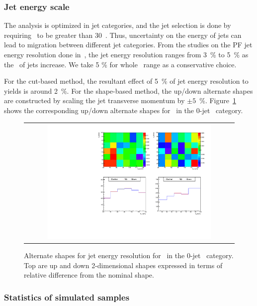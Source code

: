 \subsubsection{Jet energy scale} 

The analysis is optimized in jet categories, and the jet selection is done by 
requiring \pt\ to be greater than 30~\GeV. Thus, uncertainty on the 
energy of jets can lead to migration between different jet categories.  
From the studies on the PF jet energy resolution done in~\cite{Chatrchyan:2011ds}, 
the jet energy resolution ranges from 3~\% to 5~\% as the \Eta\ of jets increase. 
We take 5 \% for whole \Eta\ range as a conservative choice.   

For the cut-based method, the resultant effect of 5~\% of jet energy resolution 
to yields is around 2~\%. 
For the shape-based method, the up/down alternate shapes are constructed
by scaling the jet transverse momentum by $\pm 5$~\%.
Figure~\ref{fig:alter_jes} shows the corresponding up/down alternate shapes
for \qqww\ in the 0-jet \DF\ category. 

%
\begin{figure}[htp]
\centering
\begin{tabular}{c}
\includegraphics[width=0.8\textwidth]{figures/histo_qqWW_CMS_hww_MVAJESBounding_0j_zoom.pdf}
\end{tabular}
\caption{Alternate shapes for jet energy resolution for \qqww\ in the 0-jet \DF\ category.
         Top are up and down 2-dimensional shapes expressed in terms of relative 
         difference from the nominal shape.}
\label{fig:alter_jes}
\end{figure}

\subsubsection{Statistics of simulated samples} 

